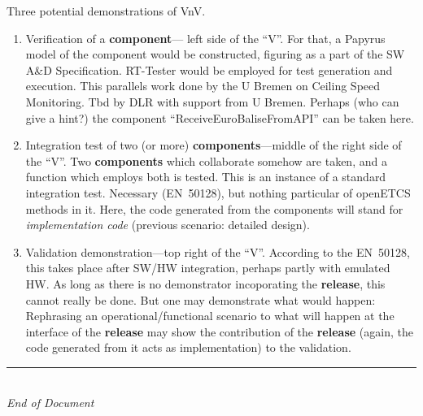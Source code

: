 \documentclass[a4paper,german]{article}
\newcommand{\nl}{\mbox{}\\}
\newcommand{\eod}{\rule{\textwidth}{1pt}\nl \textit{End of Document}}
\begin{document}
Three potential demonstrations of VnV. 
\begin{enumerate}
\item Verification of a \textbf{component}--- left side of the
  ``V''. For that, a Papyrus model of the component would be
  constructed, figuring as a part of the SW A\&D
  Specification. RT-Tester would be employed for test generation and
  execution. This parallels work done by the U Bremen on Ceiling Speed
  Monitoring. Tbd by DLR with support from U Bremen. Perhaps (who can
  give a hint?) the component ``ReceiveEuroBaliseFromAPI'' can be
  taken here.
\item Integration test of two (or more) \textbf{components}---middle
  of the right side of the ``V''. Two \textbf{components} which
  collaborate somehow are taken, and a function which employs both is
  tested. This is an instance of a standard integration
  test. Necessary (EN~50128), but nothing particular of openETCS
  methods in it. Here, the code generated from the components will
  stand for \textit{implementation code} (previous scenario: detailed design).
\item Validation demonstration---top right of the ``V''. According to
  the EN~50128, this takes place after SW/HW integration, perhaps
  partly with emulated HW. As long as there is no demonstrator
  incoporating the \textbf{release}, this cannot really be done. But one
  may demonstrate what would happen: Rephrasing an
  operational/functional scenario to what will happen at the interface
  of the \textbf{release} may show the contribution of the
  \textbf{release} (again, the code generated from it acts as
  implementation) to the validation.
\end{enumerate}

\eod


 
\end{document}
